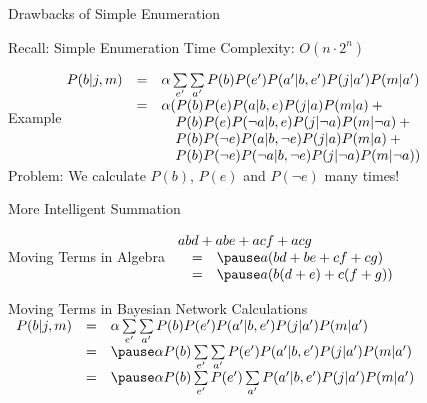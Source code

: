 \documentclass[14pt]{beamer}
\begin{document}
\begin{frame}{Drawbacks of Simple Enumeration}
\begin{block}{Recall: Simple Enumeration}
Time Complexity: $O(n\cdot 2^{n})$
\end{block}
\pause
\begin{block}{Example}
{\small$\begin{array}{@{}lll@{}}
P(b|j,m) & = & \alpha\sum\limits_{e'}\sum\limits_{a'}P(b)P(e')P(a'|b,e')P(j|a')P(m|a') \\
         & = & \alpha(P(b)P(e)P(a|b,e)P(j|a)P(m|a) + \mbox{}\\
         &   &   \tab P(b)P(e)P(\lnot a|b,e)P(j|\lnot a)P(m|\lnot a) + \mbox{}\\
         &   &   \tab P(b)P(\lnot e)P(a|b,\lnot e)P(j|a)P(m|a) + \mbox{}\\
         &   &   \tab P(b)P(\lnot e)P(\lnot a|b,\lnot e)P(j|\lnot a)P(m|\lnot a))
\end{array}$}
\\
\medskip
\pause Problem: \pause We calculate $P(b)$, $P(e)$ and $P(\lnot e)$ many times!
\end{block}
\end{frame}

\begin{frame}{More Intelligent Summation}
\begin{block}{Moving Terms in Algebra}
$
\begin{array}{lll}
\lefteqn{abd + abe + acf + acg} \\
& = & \pause a(bd + be + cf + cg) \\
& = & \pause a(b(d + e) + c(f + g)) \\
\end{array}
$
\end{block}
\pause
\begin{block}{Moving Terms in Bayesian Network Calculations}
{\small$\begin{array}{lll}
P(b|j,m) & = & \alpha\sum\limits_{e'}\sum\limits_{a'}P(b)P(e')P(a'|b,e')P(j|a')P(m|a') \\
& = & \pause
\alpha P(b)\sum\limits_{e'}\sum\limits_{a'}P(e')P(a'|b,e')P(j|a')P(m|a') \\
& = & \pause
\alpha P(b)\sum\limits_{e'}P(e')\sum\limits_{a'}P(a'|b,e')P(j|a')P(m|a')
\end{array}$}
\end{block}
\end{frame}
\end{document}
